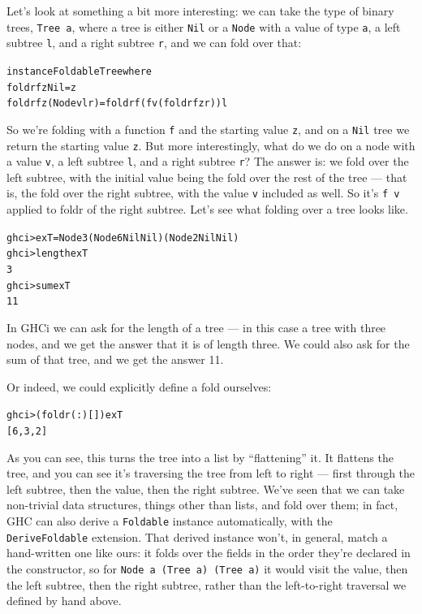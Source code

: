 Let's look at something a bit more interesting: we can take the type of binary trees, \texttt{Tree a}, where a tree is either \texttt{Nil} or a \texttt{Node} with a value of type \texttt{a}, a left subtree \texttt{l},  and a right subtree \texttt{r}, and we can fold over that:
\begin{alltt}
instance Foldable Tree where
  foldr f z Nil          = z
  foldr f z (Node v l r) = foldr f (f v (foldr f z r)) l
\end{alltt}
So we're folding with a function \texttt{f} and the starting value \texttt{z}, and on a \texttt{Nil} tree we return the starting value \texttt{z}. But more interestingly, what do we do on a node with a value \texttt{v}, a left subtree \texttt{l},  and a right subtree \texttt{r}? The answer is: we fold over the left subtree, with the initial value being the fold over the rest of the tree — that is, the fold over the right subtree, with the value \texttt{v} included as well. So it's \texttt{f v} applied to foldr of the right subtree.
Let's see what folding over a tree looks like.
\begin{alltt}
ghci> exT = Node 3 (Node 6 Nil Nil) (Node 2 Nil Nil)
ghci> length exT
3
ghci> sum exT
11
\end{alltt}
In GHCi we can ask for the length of a tree — in this case a tree with three nodes, and we get the answer that it is of length three. We could also ask for the sum of that tree, and we get the answer 11.

Or indeed, we could explicitly define a fold ourselves: 
\begin{alltt}
ghci> (foldr (:) []) exT
[6,3,2]
\end{alltt}
As you can see, this turns the tree into a list by ``flattening'' it.
It flattens the tree, and you can see it's traversing the tree from left to right — first through the left subtree, then the value, then the right subtree. We've seen that we can take non-trivial data structures, things other than lists, and fold over them; in fact, GHC can also derive a \texttt{Foldable} instance automatically, with the \texttt{DeriveFoldable} extension. That derived instance won't, in general, match a hand-written one like ours: it folds over the fields in the order they're declared in the constructor, so for \texttt{Node a (Tree a) (Tree a)} it would visit the value, then the left subtree, then the right subtree, rather than the left-to-right traversal we defined by hand above.




